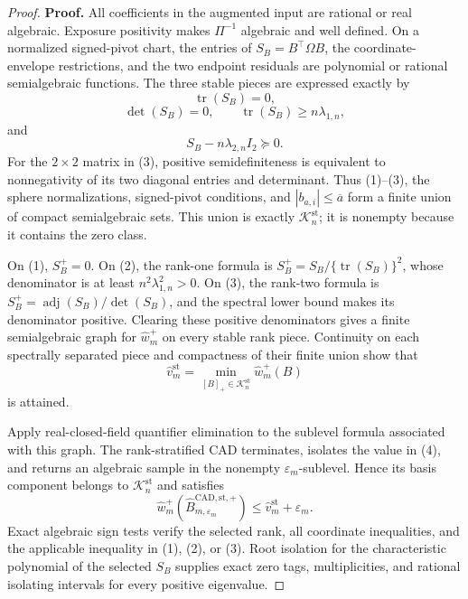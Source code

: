 \documentclass{article}
\begin{document}
\begin{proof}
\textbf{Proof.}
All coefficients in the augmented input are rational or real algebraic.  Exposure positivity makes \(\Pi^{-1}\) algebraic and well defined.  On a normalized signed-pivot chart, the entries of \(S_B=B^{\top}\Omega B\), the coordinate-envelope restrictions, and the two endpoint residuals are polynomial or rational semialgebraic functions.  The three stable pieces are expressed exactly by
\[
\operatorname{tr}(S_B)=0,
\tag{1}
\]
\[
\det(S_B)=0,\qquad \operatorname{tr}(S_B)\ge n\lambda_{1,n},
\tag{2}
\]
and
\[
S_B-n\lambda_{2,n}I_2\succeq0.
\tag{3}
\]
For the \(2\times2\) matrix in (3), positive semidefiniteness is equivalent to nonnegativity of its two diagonal entries and determinant.  Thus (1)--(3), the sphere normalizations, signed-pivot conditions, and \(|b_{a,i}|\le\overline a\) form a finite union of compact semialgebraic sets.  This union is exactly \(\mathcal K_n^{\mathrm{st}}\); it is nonempty because it contains the zero class.

On (1), \(S_B^+=0\).  On (2), the rank-one formula is \(S_B^+=S_B/\{\operatorname{tr}(S_B)\}^2\), whose denominator is at least \(n^2\lambda_{1,n}^2>0\).  On (3), the rank-two formula is \(S_B^+=\operatorname{adj}(S_B)/\det(S_B)\), and the spectral lower bound makes its denominator positive.  Clearing these positive denominators gives a finite semialgebraic graph for \(\widehat w_m^+\) on every stable rank piece.  Continuity on each spectrally separated piece and compactness of their finite union show that
\[
\widehat v_m^{\mathrm{st}}
=\min_{[B]_+\in\mathcal K_n^{\mathrm{st}}}\widehat w_m^+(B)
\tag{4}
\]
is attained.

Apply real-closed-field quantifier elimination to the sublevel formula associated with this graph.  The rank-stratified CAD terminates, isolates the value in (4), and returns an algebraic sample in the nonempty \(\varepsilon_m\)-sublevel.  Hence its basis component belongs to \(\mathcal K_n^{\mathrm{st}}\) and satisfies
\[
\widehat w_m^+(\widehat B_{m,\varepsilon_m}^{\mathrm{CAD,st},+})
\le\widehat v_m^{\mathrm{st}}+\varepsilon_m.
\tag{5}
\]
Exact algebraic sign tests verify the selected rank, all coordinate inequalities, and the applicable inequality in (1), (2), or (3).  Root isolation for the characteristic polynomial of the selected \(S_B\) supplies exact zero tags, multiplicities, and rational isolating intervals for every positive eigenvalue.


\end{proof}
\end{document}
